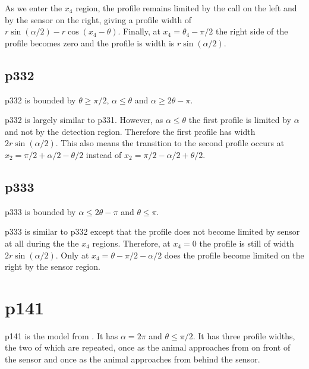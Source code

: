As we enter the $x_4$ region, the profile remains limited by the call on the left and by the sensor on the right, giving a profile width of  $r\sin (\alpha /2) -r\cos(x_4-\theta) $. Finally, at $x_4 = \theta_4 - \pi/2$ the right side of the profile becomes zero and the profile is width is $r\sin(\alpha /2)$.



\subsection{p332} \label{p332}

p332 is bounded by $\theta \ge \pi/2$, $\alpha \le \theta$ and $\alpha \ge 2\theta -\pi$.

p332 is largely similar to p331. However, as $\alpha \le \theta$ the first profile is limited by $\alpha$ and not by the detection region. Therefore the first profile has width $2r\sin(\alpha /2)$. This also means the transition to the second profile occurs at  $x_2 = \pi/2 + \alpha/2 - \theta/2$ instead of  $x_2 = \pi/2 - \alpha/2 + \theta/2$.





\subsection{p333} \label{p333}

p333 is bounded by $\alpha \le 2\theta -\pi$ and $\theta \le \pi$.

p333 is similar to p332 except that the profile does not become limited by sensor at all during the the $x_4$ regions. Therefore, at $x_4 = 0 $ the profile is still of width $2r\sin(\alpha /2)$. Only at $x_4 = \theta - \pi/2 - \alpha/2$ does the profile become limited on the right by the sensor region.



\section{p141} \label{p141}

p141 is the model from \citep{rowcliffe2008estimating}. It has $\alpha =2\pi$ and $\theta \le \pi/2$. It has three profile widths, the two of which are repeated, once as the animal approaches from on front of the sensor and once as the animal approaches from behind the sensor.

